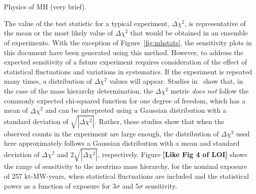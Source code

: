 Physics of MH (very brief).

The value of the test statistic for a typical experiment,  
$\overline{\Delta\chi^2}$, is
representative of the mean or the most likely value of $\Delta\chi^2$ that 
would be obtained in an ensemble of experiments.
With the exception of Figure~\ref{fig:mhstats}, the sensitivity plots
in this document have been generated using this method.
However, to address the expected sensitivity of a future experiment
requires consideration of the effect of
statistical fluctuations and variations in systematics.  If the
experiment is repeated many times, a distribution of $\Delta\chi^2$
values will appear.  Studies in~\cite{Qian:2012zn,Blennow:2013oma}
show that, in the case of the mass hierarchy
determination, the $\Delta \chi^2$ metric
{\em does not} follow the commonly expected chi-squared
function for one degree of freedom, which has a mean of
$\overline{\Delta\chi^2}$ and can be interpreted using a Gaussian
distribution with a standard deviation of
$\sqrt{|\overline{\Delta\chi^2}|}$. Rather, these studies show that
when the observed counts in the experiment are large enough,
the distribution of $\Delta\chi^2$ used here approximately follows
a Gaussian distribution with a
mean and standard deviation of $\overline{\Delta\chi^2}$ and
$2\sqrt{|\overline{\Delta\chi^2}|}$, respectively. Figure {\bf [Like Fig 4 of LOI]}
shows the range of sensitivity to the neutrino mass hierarchy, 
for the nominal exposure of 257 kt-MW-years,
when statistical
fluctuations are included and the statistical power as a function of exposure
for 3$\sigma$ and 5$\sigma$ sensitivity. 

